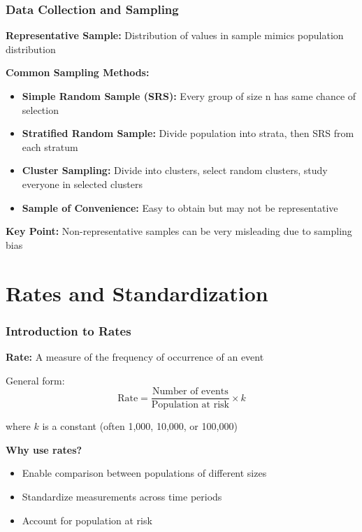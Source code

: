 \documentclass{beamer}
\begin{document}
\begin{frame}
\frametitle{Data Collection and Sampling}
\textbf{Representative Sample:} Distribution of values in sample mimics population distribution

\vspace{0.3cm}
\textbf{Common Sampling Methods:}
\begin{itemize}
\item \textbf{Simple Random Sample (SRS):} Every group of size n has same chance of selection
\item \textbf{Stratified Random Sample:} Divide population into strata, then SRS from each stratum
\item \textbf{Cluster Sampling:} Divide into clusters, select random clusters, study everyone in selected clusters
\item \textbf{Sample of Convenience:} Easy to obtain but may not be representative
\end{itemize}

\vspace{0.3cm}
\textbf{Key Point:} Non-representative samples can be very misleading due to sampling bias
\end{frame}

\section{Rates and Standardization}

\begin{frame}
\frametitle{Introduction to Rates}
\textbf{Rate:} A measure of the frequency of occurrence of an event

\vspace{0.5cm}
General form:
$$\text{Rate} = \frac{\text{Number of events}}{\text{Population at risk}} \times k$$

where $k$ is a constant (often 1,000, 10,000, or 100,000)

\vspace{0.5cm}
\textbf{Why use rates?}
\begin{itemize}
\item Enable comparison between populations of different sizes
\item Standardize measurements across time periods
\item Account for population at risk
\end{itemize}
\end{frame}
\end{document}
